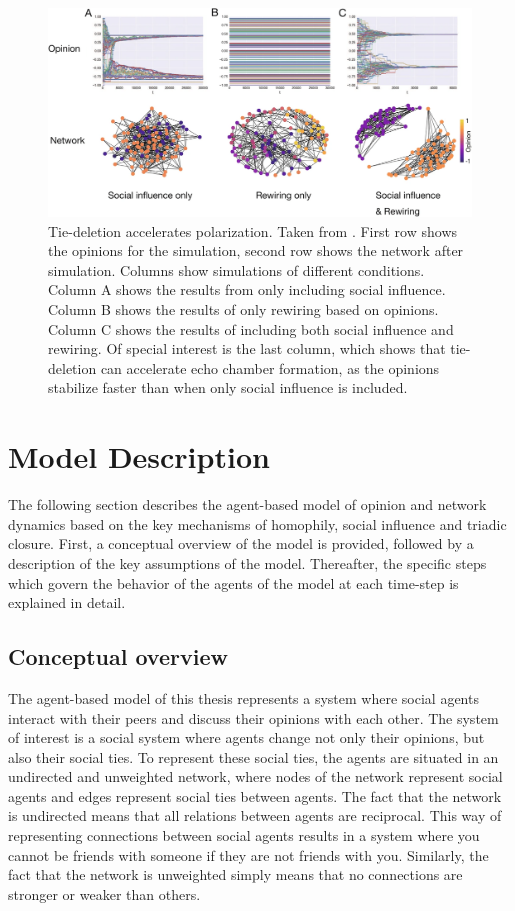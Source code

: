 \documentclass[11pt]{article}
\begin{document}
\begin{figure}[H]
    \centering
    \includegraphics[width=.8\linewidth]{../plots/references/echo_chambers.png}
  \caption{Tie-deletion accelerates polarization. Taken from \protect\citeauthor{sasahara_social_2021} \protect\citeyear{sasahara_social_2021}. First row shows the opinions for the simulation, second row shows the network after simulation. Columns show simulations of different conditions. Column A shows the results from only including social influence. Column B shows the results of only rewiring based on opinions. Column C shows the results of including both social influence and rewiring. Of special interest is the last column, which shows that tie-deletion can accelerate echo chamber formation, as the opinions stabilize faster than when only social influence is included.}
  \label{fig:echo_chambers}
\end{figure}

\section{Model Description}
The following section describes the agent-based model of opinion and network dynamics based on the key mechanisms of homophily, social influence and triadic closure. First, a conceptual overview of the model is provided, followed by a description of the key assumptions of the model. Thereafter, the specific steps which govern the behavior of the agents of the model at each time-step is explained in detail. 

\subsection{Conceptual overview}
The agent-based model of this thesis represents a system where social agents interact with their peers and discuss their opinions with each other. The system of interest is a social system where agents change not only their opinions, but also their social ties. To represent these social ties, the agents are situated in an undirected and unweighted network, where nodes of the network represent social agents and edges represent social ties between agents. The fact that the network is undirected means that all relations between agents are reciprocal. This way of representing connections between social agents results in a system where you cannot be friends with someone if they are not friends with you. Similarly, the fact that the network is unweighted simply means that no connections are stronger or weaker than others. 
\end{document}
